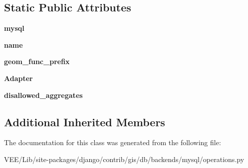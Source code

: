 \subsection*{Static Public Attributes}
\begin{DoxyCompactItemize}
\item 
\mbox{\label{classdjango_1_1contrib_1_1gis_1_1db_1_1backends_1_1mysql_1_1operations_1_1_my_s_q_l_operations_a1ee7fb46f76b84ec0aedb76521d820a2}} 
{\bfseries mysql}
\item 
\mbox{\label{classdjango_1_1contrib_1_1gis_1_1db_1_1backends_1_1mysql_1_1operations_1_1_my_s_q_l_operations_a1a943468175152979875446916d3e273}} 
{\bfseries name}
\item 
\mbox{\label{classdjango_1_1contrib_1_1gis_1_1db_1_1backends_1_1mysql_1_1operations_1_1_my_s_q_l_operations_ab8c998914018e5324f06d110dfb68d44}} 
{\bfseries geom\+\_\+func\+\_\+prefix}
\item 
\mbox{\label{classdjango_1_1contrib_1_1gis_1_1db_1_1backends_1_1mysql_1_1operations_1_1_my_s_q_l_operations_a795a7a7b1b4b2207e99898d21629ff13}} 
{\bfseries Adapter}
\item 
\mbox{\label{classdjango_1_1contrib_1_1gis_1_1db_1_1backends_1_1mysql_1_1operations_1_1_my_s_q_l_operations_a2339a622176f1d433bda12864c6afccb}} 
{\bfseries disallowed\+\_\+aggregates}
\end{DoxyCompactItemize}
\subsection*{Additional Inherited Members}


The documentation for this class was generated from the following file\+:\begin{DoxyCompactItemize}
\item 
V\+E\+E/\+Lib/site-\/packages/django/contrib/gis/db/backends/mysql/operations.\+py\end{DoxyCompactItemize}

